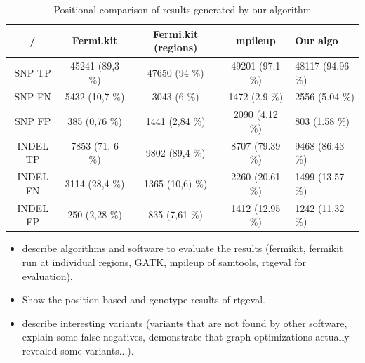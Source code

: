 \begin{table}[h]
\begin{center}
\caption{Positional comparison of results generated by our algorithm}
\label{tab:positional-results}
\begin{tabular}{| c | c | c | c | p{3cm} |}
\hline
/ & Fermi.kit & Fermi.kit (regions) & mpileup & Our algo \\
\hline
SNP TP & 45241 (89,3 \%) & 47650 (94 \%) & 49201 (97.1 \%) & 48117 (94.96 \%) \\
\hline
SNP FN & 5432 (10,7 \%) & 3043 (6 \%) & 1472 (2.9 \%) & 2556 (5.04 \%) \\
\hline
SNP FP & 385 (0,76 \%) & 1441 (2,84 \%) & 2090 (4.12 \%) & 803 (1.58 \%) \\
\hline
INDEL TP & 7853 (71, 6 \%) & 9802 (89,4 \%) & 8707 (79.39 \%) & 9468 (86.43 \%) \\
\hline
INDEL FN & 3114 (28,4 \%) & 1365 (10,6) \%) & 2260 (20.61 \%) & 1499 (13.57 \%) \\
\hline
INDEL FP & 250 (2,28 \%) & 835 (7,61 \%) & 1412 (12.95 \%) & 1242 (11.32 \%) \\
\hline
\end{tabular}
\end{center}
\end{table}

\begin{itemize}
\item describe algorithms and software to evaluate the results (fermikit, fermikit run at individual regions, GATK, mpileup of samtools, rtgeval for evaluation),
\item Show the position-based and genotype results of rtgeval.
\item describe interesting variants (variants that are not found by other software, explain some false negatives, demonstrate that graph optimizations actually revealed some variants...).
\end{itemize}
